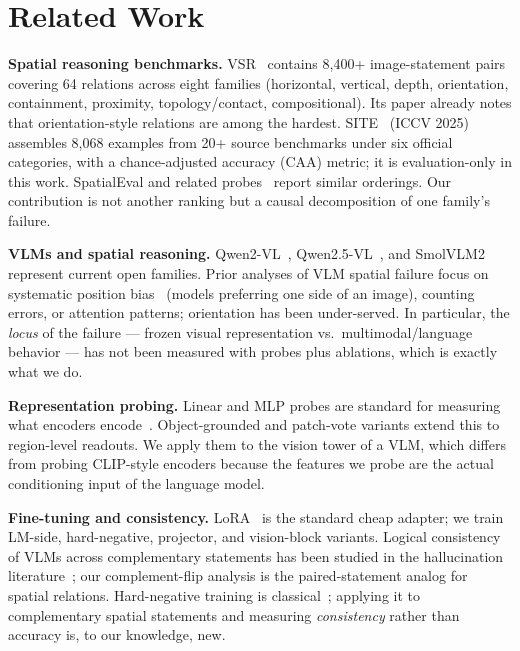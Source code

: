 \section{Related Work}
\label{sec:related}

\textbf{Spatial reasoning benchmarks.} VSR~\cite{liu2023vsr} contains 8{,}400+
image-statement pairs covering 64 relations across eight families (horizontal,
vertical, depth, orientation, containment, proximity, topology/contact,
compositional). Its paper already notes that orientation-style relations are among
the hardest. SITE~\cite{wang2025site} (ICCV 2025) assembles 8{,}068 examples from
20+ source benchmarks under six official categories, with a chance-adjusted
accuracy (CAA) metric; it is evaluation-only in this work. SpatialEval and
related probes~\cite{li2024spatialeval} report similar orderings. Our contribution
is not another ranking but a causal decomposition of one family's failure.

\textbf{VLMs and spatial reasoning.} Qwen2-VL~\cite{wang2024qwen2vl},
Qwen2.5-VL~\cite{bai2025qwen25vl}, and SmolVLM2~\cite{huggingface2025smolvlm2}
represent current open families. Prior analyses of VLM spatial failure focus on
systematic position bias~\cite{kamath2023does} (models preferring one side of an
image), counting errors, or attention patterns; orientation has been
under-served. In particular, the \emph{locus} of the failure --- frozen visual
representation vs.\ multimodal/language behavior --- has not been measured with
probes plus ablations, which is exactly what we do.

\textbf{Representation probing.} Linear and MLP probes are standard for
measuring what encoders encode~\cite{alain2016understanding}. Object-grounded and
patch-vote variants extend this to region-level readouts. We apply them to the
vision tower of a VLM, which differs from probing CLIP-style encoders because the
features we probe are the actual conditioning input of the language model.

\textbf{Fine-tuning and consistency.} LoRA~\cite{hu2022lora} is the standard
cheap adapter; we train LM-side, hard-negative, projector, and vision-block
variants. Logical consistency of VLMs across complementary statements has been
studied in the hallucination literature~\cite{li2023evaluating}; our
complement-flip analysis is the paired-statement analog for spatial relations.
Hard-negative training is classical~\cite{shrivastava2016training}; applying it to
complementary spatial statements and measuring \emph{consistency} rather than
accuracy is, to our knowledge, new.
